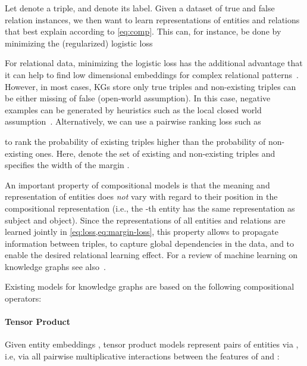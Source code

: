 \documentclass[letterpaper]{article}
\begin{document}
Let  denote a triple, and
 denote its label.
Given a dataset  of true and false relation
instances, we then want to learn representations of entities and relations
 that best explain  according to \cref{eq:comp}. This can, for instance, be
done by minimizing the (regularized) logistic loss

For relational data, minimizing the logistic loss has the additional advantage
that it can help to find low dimensional embeddings for complex relational
patterns~\citep{bouchard2015approximate}.
However, in most cases, KGs store only true triples and non-existing
triples can be either missing of false (open-world
assumption). In this case, negative examples can be generated by heuristics
such as the local closed world assumption~\citep{dong2014knowledge}.
Alternatively, we can use a pairwise ranking loss such as 

to rank the probability of existing triples higher than 
the probability of non-existing ones. Here,  
 denote the set of existing and non-existing
triples and  specifies the width of the margin \citep{bordes_learning_2011}.

An important property of compositional models is that the meaning and
representation of entities does \emph{not} vary with regard to their position in
the compositional representation (i.e., the -th entity has the same
representation  as subject and object). Since the representations of all
entities and relations are learned jointly in \cref{eq:loss,eq:margin-loss},
this property allows to propagate information between triples, to capture
global dependencies in the data, and to enable the desired relational learning
effect. 
For a review of machine learning on knowledge graphs
see also~\citet{nickel2015review}.


Existing models for knowledge graphs are based on the following compositional
operators:
\paragraph{Tensor Product}
Given entity embeddings , tensor product models
represent pairs of entities via , i.e,
via all pairwise multiplicative interactions between the features of  and
:
\end{document}
